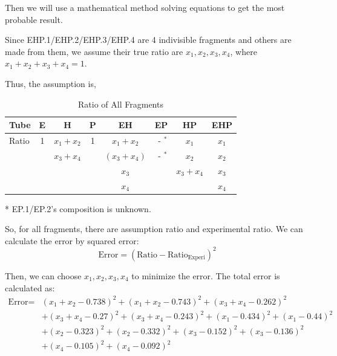 \documentclass{article}
\begin{document}
            Then we will use a mathematical method solving equations to get the most probable result.

            Since EHP.1/EHP.2/EHP.3/EHP.4 are 4 indivisible fragments and others are made from them, we assume their true ratio are $x_1, x_2, x_3, x_4$, where $x_1 + x_2 + x_3 + x_4 = 1$.

            Thus, the assumption is,
            \begin{table}[H]
                \caption{Ratio of All Fragments}
                \centering
                \begin{threeparttable}
                    \begin{tabular}{|l|c|c|c|c|c|c|c|}
                        \hline
                        Tube&E&H&P&EH&EP&HP&EHP\\
                        \hline
                        Ratio&1&$x_1 + x_2$&1&$x_1 + x_2$&$\text{ - }^*$&$x_1$&$x_1$\\
                        &&$x_3 + x_4$&&$(x_3 + x_4)$&$\text{ - }^*$&$x_2$&$x_2$\\
                        &&&&$x_3$&&$x_3 + x_4$&$x_3$\\
                        &&&&$x_4$&&&$x_4$\\
                        \hline
                    \end{tabular}
                    \begin{tablenotes}
                            \footnotesize
                            \item[*] EP.1/EP.2's composition is unknown.
                        \end{tablenotes}
                \end{threeparttable}
                \label{data.ratio.x}
            \end{table}

            So, for all fragments, there are assumption ratio and experimental ratio. We can calculate the error by squared error:
            $$\text{Error} = (\text{Ratio} - \text{Ratio}_{\text{Experi}})^2$$

            Then, we can choose $x_1, x_2, x_3, x_4$ to minimize the error. The total error is calculated as:
            $$\begin{aligned}
            \text{Error} = &(x_1 + x_2 - 0.738) ^ 2 + (x_1 + x_2 - 0.743) ^ 2 + (x_3 + x_4 - 0.262) ^ 2\\
            &+(x_3 + x_4 - 0.27) ^ 2 + (x_3 + x_4 - 0.243) ^ 2 + (x_1 - 0.434)^2 + (x_1 - 0.44)^2\\
            &+(x_2 - 0.323)^2 + (x_2 - 0.332)^2 + (x_3 - 0.152)^2 + (x_3 - 0.136)^2\\
            &+(x_4 - 0.105)^2 + (x_4 - 0.092)^2\\
            \end{aligned}$$
\end{document}
